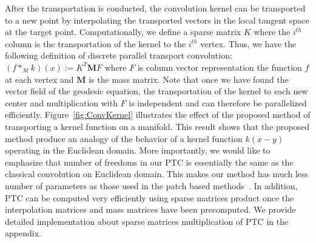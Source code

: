 \documentclass[10pt,twocolumn,letterpaper]{article}
\def\M{\mathcal{M}}
\begin{document}
After the transportation is conducted, the convolution kernel can be transported to a new point by interpolating the transported vectors in the local tangent space at the target point.
Computationally, we define a sparse matrix $K$ where the $i^{th}$ column is the transportation of the kernel to the $i^{th}$ vertex. Thus, we have the following definition of discrete parallel transport convolution:
$(f *_{\M} k) (x) :=  K^T \textbf{M} F$
where $F$ is column vector representation the function $f$ at each vertex and $\textbf{M}$ is the mass matrix. Note that once we have found the vector field of the geodesic equation, the transportation of the kernel to each new center and multiplication with $F$ is independent and can therefore be parallelized efficiently. 
Figure~\ref{fig:ConvKernel} illustrates the effect of the proposed method of transporting a kernel function on a manifold. This result shows that the proposed method produce an analogy of the behavior of a kernel function $k(x-y)$ operating in the Euclidean domain. More importantly, we would like to emphasize that number of freedoms in our PTC is essentially the same as the classical convolution on Euclidean domain. This makes our method has much less number of parameters as those used in the patch based methods~\cite{masci2015geodesic}. In addition, PTC can be computed very efficiently using sparse matrices product once the interpolation matrices and mass matrices have been precomputed. We provide detailed implementation about sparse matrices multiplication of PTC in the appendix. 
\end{document}
